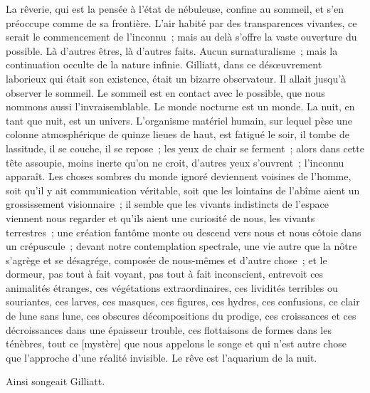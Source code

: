 \documentclass[french,twoside]{book} %
\newcommand\corr[1]{#1}
\begin{document}
La rêverie, qui est la pensée à l’état de nébuleuse, confine au sommeil, et s’en préoccupe comme de sa frontière. L’air habité par des transparences vivantes, ce serait le commencement de l’inconnu ; mais au delà s’offre la vaste ouverture du possible. Là d’autres êtres, là d’autres faits. Aucun surnaturalisme ; mais la continuation occulte de la nature infinie. Gilliatt, dans ce désœuvrement laborieux qui était son existence, était un bizarre observateur. Il allait jusqu’à observer le sommeil. Le sommeil est en contact avec le possible, que nous nommons aussi l’invraisemblable. Le monde nocturne est un monde. La nuit, en tant que nuit, est un univers. L’organisme matériel humain, sur lequel pèse une colonne atmosphérique de quinze lieues de haut, est fatigué le soir, il tombe de lassitude, il se couche, il se repose ; les yeux de chair se ferment ; alors dans cette tête assoupie, moins inerte qu’on ne croit, d’autres yeux s’ouvrent ; l’inconnu apparaît. Les choses sombres du monde ignoré deviennent voisines de l’homme, soit qu’il y ait communication véritable,  soit que les lointains de l’abîme aient un grossissement visionnaire ; il semble que les vivants indistincts de l’espace viennent nous regarder et qu’ils aient une curiosité de nous, les vivants terrestres ; une création fantôme monte ou descend vers nous et nous côtoie dans un crépuscule ; devant notre contemplation spectrale, une vie autre que la nôtre s’agrège et se désagrége, composée de nous-mêmes et d’autre chose ; et le dormeur, pas tout à fait voyant, pas tout à fait inconscient, entrevoit ces animalités étranges, ces végétations extraordinaires, ces lividités terribles ou souriantes, ces larves, ces masques, ces figures, ces hydres, ces confusions, ce clair de lune sans lune, ces obscures décompositions du prodige, ces croissances et ces décroissances dans une épaisseur trouble, ces flottaisons de formes dans les ténèbres, tout ce [{\corr mystère}] que nous appelons le songe et qui n’est autre chose que l’approche d’une réalité invisible. Le rêve est l’aquarium de la nuit.\par
Ainsi songeait Gilliatt.
\end{document}
